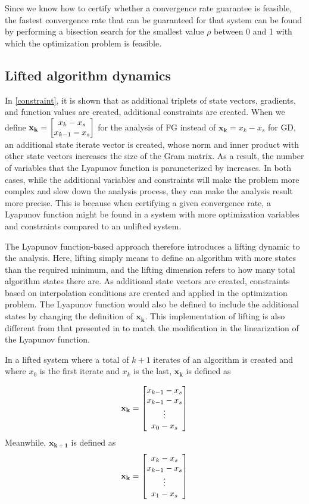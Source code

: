 Since we know how to certify whether a convergence rate guarantee is feasible, the fastest convergence rate that can be guaranteed for that system can be found by performing a bisection search for the smallest value $\rho$ between 0 and 1 with which the optimization problem is feasible.

\subsection*{Lifted algorithm dynamics}

In \cref{constraint}, it is shown that as additional triplets of state vectors, gradients, and function values are created, additional constraints are created. When we define $\mathbf{x_k} = \begin{bmatrix}x_{k} - x_s \\ x_{k-1} - x_s\end{bmatrix}$ for the analysis of FG instead of $\mathbf{x_k} = x_k - x_s$ for GD, an additional state iterate vector is created, whose norm and inner product with other state vectors increases the size of the Gram matrix. As a result, the number of variables that the Lyapunov function is parameterized by increases. In both cases, while the additional variables and constraints will make the problem more complex and slow down the analysis process, they can make the analysis result more precise. This is because when certifying a given convergence rate, a Lyapunov function might be found in a system with more optimization variables and constraints compared to an unlifted system.

The Lyapunov function-based approach therefore introduces a lifting dynamic to the analysis. Here, lifting simply means to define an algorithm with more states than the required minimum, and the lifting dimension refers to how many total algorithm states there are. As additional state vectors are created, constraints based on interpolation conditions are created and applied in the optimization problem. The Lyapunov function would also be defined to include the additional states by changing the definition of $\mathbf{x_k}$. This implementation of lifting is also different from that presented in \cite{tutorial} to match the modification in the linearization of the Lyapunov function.

In a lifted system where a total of $k+1$ iterates of an algorithm is created and where $x_0$ is the first iterate and $x_{k}$ is the last, $\mathbf{x_k}$ is defined as

\begin{equation} \label{lifted_v}
	\mathbf{x_k} = \begin{bmatrix}x_{k-1} - x_s \\ x_{k-1} - x_s \\ \vdots \\ x_0 - x_s\end{bmatrix}
\end{equation}
Meanwhile, $\mathbf{x_{k+1}}$ is defined as
\begin{equation} \label{lifted_v+}
	\mathbf{x_k} = \begin{bmatrix}x_{k} - x_s \\ x_{k-1} - x_s \\ \vdots \\ x_1 - x_s\end{bmatrix}
\end{equation}

